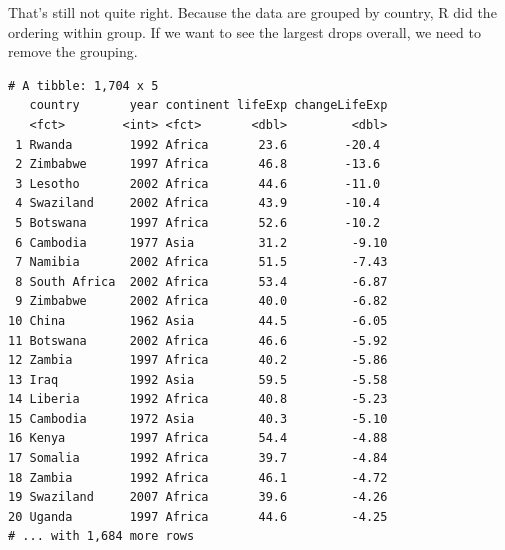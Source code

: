 \documentclass[]{krantz}
\makeatletter
\newenvironment{Shaded}{\begin{snugshade}}{\end{snugshade}}
\newcommand{\KeywordTok}[1]{\textcolor[rgb]{0.27,0.27,0.27}{\textbf{#1}}}
\newcommand{\DataTypeTok}[1]{\textcolor[rgb]{0.27,0.27,0.27}{#1}}
\newcommand{\DecValTok}[1]{\textcolor[rgb]{0.06,0.06,0.06}{#1}}
\newcommand{\StringTok}[1]{\textcolor[rgb]{0.5,0.5,0.5}{#1}}
\newcommand{\OperatorTok}[1]{\textcolor[rgb]{0.43,0.43,0.43}{\textbf{#1}}}
\newcommand{\NormalTok}[1]{#1}
\newenvironment{kframe}{%
\medskip{}
\setlength{\fboxsep}{.8em}
 \def\at@end@of@kframe{}%
 \ifinner\ifhmode%
  \def\at@end@of@kframe{\end{minipage}}%
  \begin{minipage}{\columnwidth}%
 \fi\fi%
 \def\FrameCommand##1{\hskip\@totalleftmargin \hskip-\fboxsep
 \colorbox{shadecolor}{##1}\hskip-\fboxsep
     \hskip-\linewidth \hskip-\@totalleftmargin \hskip\columnwidth}%
 \MakeFramed {\advance\hsize-\width
   \@totalleftmargin\z@ \linewidth\hsize
   \@setminipage}}%
 {\par\unskip\endMakeFramed%
 \at@end@of@kframe}
\renewenvironment{Shaded}{\begin{kframe}}{\end{kframe}}
\makeatother
\begin{document}
That's still not quite right. Because the data are grouped by country, R
did the ordering within group. If we want to see the largest drops
overall, we need to remove the grouping.

\begin{Shaded}
\end{Shaded}

\begin{verbatim}
# A tibble: 1,704 x 5
   country       year continent lifeExp changeLifeExp
   <fct>        <int> <fct>       <dbl>         <dbl>
 1 Rwanda        1992 Africa       23.6        -20.4 
 2 Zimbabwe      1997 Africa       46.8        -13.6 
 3 Lesotho       2002 Africa       44.6        -11.0 
 4 Swaziland     2002 Africa       43.9        -10.4 
 5 Botswana      1997 Africa       52.6        -10.2 
 6 Cambodia      1977 Asia         31.2         -9.10
 7 Namibia       2002 Africa       51.5         -7.43
 8 South Africa  2002 Africa       53.4         -6.87
 9 Zimbabwe      2002 Africa       40.0         -6.82
10 China         1962 Asia         44.5         -6.05
11 Botswana      2002 Africa       46.6         -5.92
12 Zambia        1997 Africa       40.2         -5.86
13 Iraq          1992 Asia         59.5         -5.58
14 Liberia       1992 Africa       40.8         -5.23
15 Cambodia      1972 Asia         40.3         -5.10
16 Kenya         1997 Africa       54.4         -4.88
17 Somalia       1992 Africa       39.7         -4.84
18 Zambia        1992 Africa       46.1         -4.72
19 Swaziland     2007 Africa       39.6         -4.26
20 Uganda        1997 Africa       44.6         -4.25
# ... with 1,684 more rows
\end{verbatim}
\end{document}
